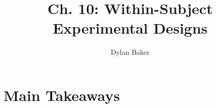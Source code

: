 \documentclass[10pt]{article}
\title{Ch. 10: Within-Subject Experimental Designs}
\author{Dylan Baker}
\begin{document}
\maketitle

\tableofcontents


\section{Main Takeaways}

\subsection{}
\end{document}
